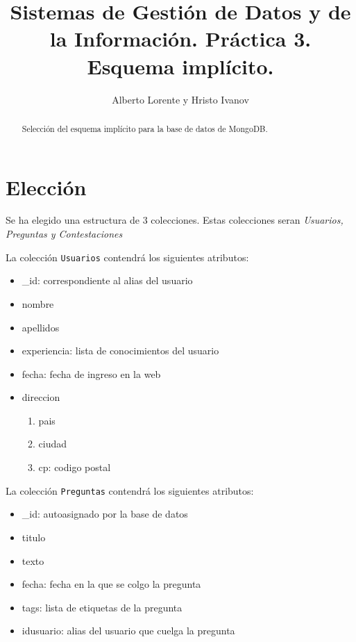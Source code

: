 \documentclass{article}
\begin{document}
\title{Sistemas de Gestión de Datos y de la Información. Práctica 3. \\ Esquema implícito.}
\author{Alberto Lorente y Hristo Ivanov}
\maketitle

  \begin{abstract}
     Selección del esquema implícito para la base de datos de MongoDB.
  \end{abstract}

  \section{Elección}
    Se ha elegido una estructura de 3 colecciones. Estas colecciones seran \emph{Usuarios, Preguntas y Contestaciones}
    \par
    La colección \texttt{Usuarios} contendrá los siguientes atributos:   
    \begin{itemize}  
        \item _id: correspondiente al alias del usuario 
        \item nombre
        \item apellidos
        \item experiencia: lista de conocimientos del usuario
        \item fecha: fecha de ingreso en la web
        \item direccion
        \begin{enumerate}
          \item pais
          \item ciudad
          \item cp: codigo postal
        \end{enumerate}
    \end{itemize}
    \par
    La colección \texttt{Preguntas} contendrá los siguientes atributos:   
    \begin{itemize}  
        \item _id: autoasignado por la base de datos 
        \item titulo
        \item texto
        \item fecha: fecha en la que se colgo la pregunta
        \item tags: lista de etiquetas de la pregunta
        \item idusuario: alias del usuario que cuelga la pregunta
    \end{itemize}
\end{document}
